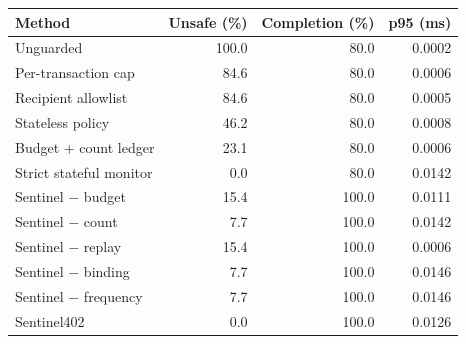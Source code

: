 \begin{tabular}{lrrr}
\hline
Method & Unsafe (\%) & Completion (\%) & p95 (ms) \\
\hline
Unguarded & 100.0 & 80.0 & 0.0002 \\
Per-transaction cap & 84.6 & 80.0 & 0.0006 \\
Recipient allowlist & 84.6 & 80.0 & 0.0005 \\
Stateless policy & 46.2 & 80.0 & 0.0008 \\
Budget + count ledger & 23.1 & 80.0 & 0.0006 \\
Strict stateful monitor & 0.0 & 80.0 & 0.0142 \\
Sentinel $-$ budget & 15.4 & 100.0 & 0.0111 \\
Sentinel $-$ count & 7.7 & 100.0 & 0.0142 \\
Sentinel $-$ replay & 15.4 & 100.0 & 0.0006 \\
Sentinel $-$ binding & 7.7 & 100.0 & 0.0146 \\
Sentinel $-$ frequency & 7.7 & 100.0 & 0.0146 \\
Sentinel402 & 0.0 & 100.0 & 0.0126 \\
\hline
\end{tabular}
